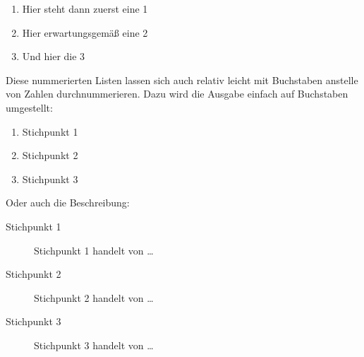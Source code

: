 \documentclass[11pt,a4paper,twoside]{scrreprt}
\begin{document}
\begin{enumerate}
\item Hier steht dann zuerst eine 1 
\item Hier erwartungsgem\"a\ss{} eine 2
\item Und hier die 3
\end{enumerate}


Diese nummerierten Listen lassen sich auch relativ leicht
mit Buchstaben anstelle von Zahlen durchnummerieren. 
Dazu wird die Ausgabe einfach auf Buchstaben umgestellt:


\renewcommand{\labelenumi}{\alph{enumi}}
\begin{enumerate}
\item Stichpunkt 1
\item Stichpunkt 2
\item Stichpunkt 3
\end{enumerate}

Oder auch die Beschreibung:

\begin{description}
\item[Stichpunkt 1]{ Stichpunkt 1 handelt von \dots}
\item[Stichpunkt 2]{ Stichpunkt 2 handelt von \dots}
\item[Stichpunkt 3]{ Stichpunkt 3 handelt von \dots}
\end{description}

\fi
\end{document}
